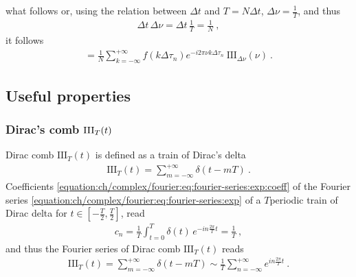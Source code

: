 \documentclass[letterpaper,10pt,english]{jupyterBook}
\begin{document}
\sphinxAtStartPar
   what follows
or, using the relation between \(\Delta t\) and \(T = N \Delta t\), \(\Delta \nu = \frac{1}{T}\), and thus
\begin{equation*}
\begin{split}\Delta t \, \Delta \nu = \Delta t \, \frac{1}{T} = \frac{1}{N} \ ,\end{split}
\end{equation*}
\sphinxAtStartPar
it follows
\begin{equation*}
\begin{split}
 = \frac{1}{N} \sum_{k=-\infty}^{+\infty} f(k \Delta \tau_n) e^{-i 2 \pi \nu k \Delta \tau_n} \ \text{III}_{\Delta \nu}(\nu) \ .
\end{split}
\end{equation*}



\subsection{Useful properties}
\label{\detokenize{ch/complex/fourier-transforms:useful-properties}}\label{\detokenize{ch/complex/fourier-transforms:complex-fourier-useful-properties}}

\subsubsection{Dirac’s comb \protect\(\text{III}_T(t)\protect\)}
\label{\detokenize{ch/complex/fourier-transforms:dirac-s-comb-text-iii-t-t}}\label{\detokenize{ch/complex/fourier-transforms:complex-fourier-useful-properties-dirac-comb}}
\sphinxAtStartPar
Dirac comb \(\text{III}_T(t)\) is defined as a train of Dirac’s delta
\begin{equation*}
\begin{split}\text{III}_T(t) = \sum_{m=-\infty}^{+\infty} \delta(t-mT) \ .\end{split}
\end{equation*}
\sphinxAtStartPar
Coefficients \eqref{equation:ch/complex/fourier:eq:fourier-series:exp:coeff} of the Fourier series \eqref{equation:ch/complex/fourier:eq:fourier-series:exp} of a \(T\)\sphinxhyphen{}periodic train of Dirac delta for \(t \in \left[-\frac{T}{2}, \frac{T}{2} \right]\), read
\begin{equation*}
\begin{split}c_n = \frac{1}{T} \int_{t=0}^{T} \delta(t) \, e^{-i n \frac{2\pi}{T} t} = \frac{1}{T} \ ,\end{split}
\end{equation*}
\sphinxAtStartPar
and thus the Fourier series of Dirac comb \(\text{III}_T(t)\) reads
\begin{equation*}
\begin{split}\text{III}_T(t) = \sum_{m=-\infty}^{+\infty} \delta(t-mT) \sim \frac{1}{T} \sum_{n=-\infty}^{+\infty} e^{i n \frac{2\pi}{T} t} \ .\end{split}
\end{equation*}
\end{document}
